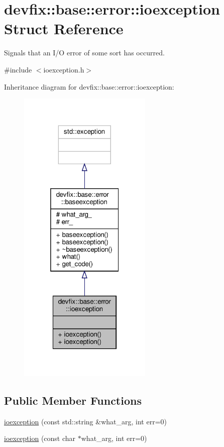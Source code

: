 \hypertarget{structdevfix_1_1base_1_1error_1_1ioexception}{}\section{devfix\+:\+:base\+:\+:error\+:\+:ioexception Struct Reference}
\label{structdevfix_1_1base_1_1error_1_1ioexception}


Signals that an I/O error of some sort has occurred.  




{\ttfamily \#include $<$ioexception.\+h$>$}



Inheritance diagram for devfix\+:\+:base\+:\+:error\+:\+:ioexception\+:\nopagebreak
\begin{figure}[H]
\begin{center}
\leavevmode
\includegraphics[width=181pt]{structdevfix_1_1base_1_1error_1_1ioexception__inherit__graph}
\end{center}
\end{figure}
\subsection*{Public Member Functions}
\begin{DoxyCompactItemize}
\item 
\hyperlink{structdevfix_1_1base_1_1error_1_1ioexception_ac44798aad44f6803e385ad36effed298}{ioexception} (const std\+::string \&what\+\_\+arg, int err=0)
\item 
\hyperlink{structdevfix_1_1base_1_1error_1_1ioexception_a2f029b0f81a5a369705cf7920cadd8cd}{ioexception} (const char $\ast$what\+\_\+arg, int err=0)
\end{DoxyCompactItemize}
